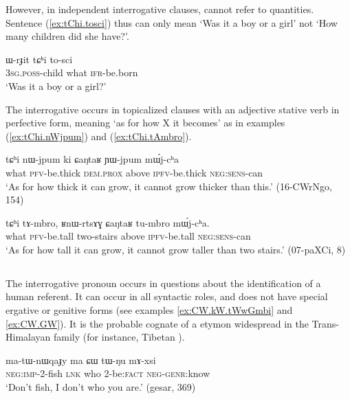 However, in independent interrogative clauses,  cannot refer to quantities. Sentence (\ref{ex:tChi.tosci}) thus can only mean `Was it a boy or a girl' not `How many children did she have?'.

\begin{exe}
\ex \label{ex:tChi.tosci}
\gll  ɯ-rɟit tɕʰi to-sci \\
\textsc{3sg.poss}-child what \textsc{ifr}-be.born \\
\glt `Was it a boy or a girl?'
\end{exe}  


The interrogative  occurs in topicalized clauses with an adjective stative verb in perfective form, meaning `as for how X it becomes' as in examples (\ref{ex:tChi.nWjpum}) and (\ref{ex:tChi.tAmbro}).

\begin{exe}
\ex \label{ex:tChi.nWjpum}
\gll tɕʰi nɯ-jpum ki ɕaŋtaʁ ɲɯ-jpum mɯ́j-cʰa \\
what \textsc{pfv}-be.thick \textsc{dem}.\textsc{prox} above \textsc{ipfv}-be.thick \textsc{neg}:\textsc{sens}-can \\
\glt `As for how thick it can grow, it cannot grow thicker than this.' (16-CWrNgo, 154)
\end{exe}


\begin{exe}
\ex \label{ex:tChi.tAmbro}
\gll tɕʰi tɤ-mbro, ʁnɯ-rtsɤɣ ɕaŋtaʁ tu-mbro mɯ́j-cʰa.  \\
what \textsc{pfv}-be.tall two-stairs above \textsc{ipfv}-be.tall \textsc{neg}:\textsc{sens}-can \\
\glt `As for how tall it can grow, it cannot grow taller than two stairs.' (07-paXCi, 8)
\end{exe}

\subsection{}
The interrogative pronoun  occurs in questions about the identification of a human referent. It can occur in all syntactic roles, and does not have special ergative or genitive forms (see examples \ref{ex:CW.kW.tWwGmbi} and \ref{ex:CW.GW}). It is the probable cognate of a etymon widespread in the Trans-Himalayan family (for instance, Tibetan ).

\begin{exe}
\ex  \label{ex:CW.tWNu}
\gll ma-tɯ-nɯqaɟy ma ɕɯ tɯ-ŋu mɤ-xsi \\
\textsc{neg:imp}-2-fish \textsc{lnk} who 2-be:\textsc{fact} \textsc{neg-genr}:know   \\
\glt `Don't fish, I don't who you are.' (gesar, 369)
\end{exe}  

